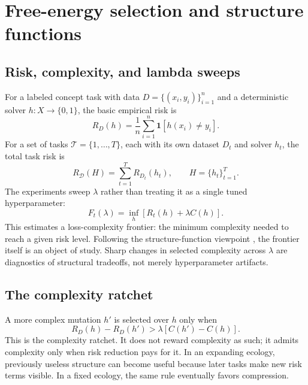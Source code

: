 \documentclass[11pt]{article}
\begin{document}
\section{Free-energy selection and structure functions}

\subsection{Risk, complexity, and lambda sweeps}

For a labeled concept task with data $D=\{(x_i,y_i)\}_{i=1}^{n}$ and a
deterministic solver $h:X\to\{0,1\}$, the basic empirical risk is
\begin{equation}
  R_D(h)=\frac{1}{n}\sum_{i=1}^{n}\mathbf{1}[h(x_i)\ne y_i].
  \label{eq:risk}
\end{equation}
For a set of tasks $\mathcal{T}=\{1,\ldots,T\}$, each with its own dataset
$D_t$ and solver $h_t$, the total task risk is
\begin{equation}
  R_{\mathcal{D}}(H)=\sum_{t=1}^{T}R_{D_t}(h_t),
  \qquad H=\{h_t\}_{t=1}^{T}.
  \label{eq:total-risk}
\end{equation}
The experiments sweep $\lambda$ rather than treating it as a single tuned
hyperparameter:
\begin{equation}
  F_t(\lambda)=\inf_{h}\left[R_t(h)+\lambda C(h)\right].
  \label{eq:lambda-frontier}
\end{equation}
This estimates a loss-complexity frontier: the minimum complexity needed to
reach a given risk level. Following the structure-function viewpoint
\cite{kolpakov2025loss}, the frontier itself is an object of study. Sharp
changes in selected complexity across $\lambda$ are diagnostics of structural
tradeoffs, not merely hyperparameter artifacts.

\subsection{The complexity ratchet}

A more complex mutation $h'$ is selected over $h$ only when
\begin{equation}
  R_D(h)-R_D(h')>\lambda\left[C(h')-C(h)\right].
  \label{eq:ratchet}
\end{equation}
This is the complexity ratchet. It does not reward complexity as such; it admits
complexity only when risk reduction pays for it. In an expanding ecology,
previously useless structure can become useful because later tasks make new risk
terms visible. In a fixed ecology, the same rule eventually favors compression.
\end{document}
